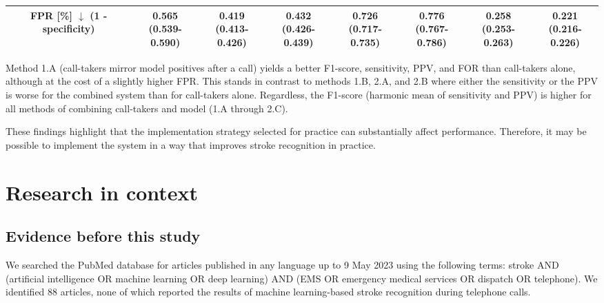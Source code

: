 {\begin{sidewaystable}
{\begin{tabular}{c|c|cc|cc|cc}
            \midrule
            \makecell[l]{{FPR} [\%] $\downarrow$ \\ (1 - specificity)} & \makecell[c]{0.565 \\ (0.539-0.590)} & \makecell[c]{0.419 \\ (0.413-0.426)} & \makecell[c]{0.432 \\ (0.426-0.439)} & \makecell[c]{0.726 \\ (0.717-0.735)} & \makecell[c]{0.776 \\ (0.767-0.786)} & \makecell[c]{0.258 \\ (0.253-0.263)} & \makecell[c]{0.221 \\ (0.216-0.226)} \\

            \bottomrule
        \end{tabular}%
    }
\end{sidewaystable}

Method 1.A (call-takers mirror model positives after a call) yields a better F1-score, sensitivity, PPV, and FOR than call-takers alone, although at the cost of a slightly higher FPR. This stands in contrast to methods 1.B, 2.A, and 2.B where either the sensitivity or the PPV is worse for the combined system than for call-takers alone. Regardless, the F1-score (harmonic mean of sensitivity and PPV) is higher for all methods of combining call-takers and model (1.A through 2.C).

These findings highlight that the implementation strategy selected for practice can substantially affect performance. Therefore, it may be possible to implement the system in a way that improves stroke recognition in practice.


\section{Research in context}

\subsection{Evidence before this study}

We searched the PubMed database for articles published in any language up to 9 May 2023 using the following terms: stroke AND (artificial intelligence OR machine learning OR deep learning) AND (EMS OR emergency medical services OR dispatch OR telephone). We identified 88 articles, none of which reported the results of machine learning-based stroke recognition during telephone calls.

}
